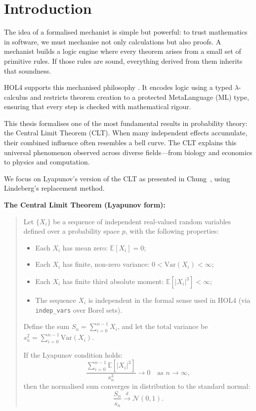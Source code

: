 \chapter[Introduction]{Introduction}
\label{chap:1}

The idea of a formalised mechanist is simple but powerful: to trust mathematics in software, we must mechanise not only calculations but also proofs. A mechanist builds a logic engine where every theorem arises from a small set of primitive rules. If those rules are sound, everything derived from them inherits that soundness.

HOL4 supports this mechanised philosophy \cite{slind2008brief}. It encodes logic using a typed \(\lambda\)-calculus and restricts theorem creation to a protected MetaLanguage (ML) type, ensuring that every step is checked with mathematical rigour.

This thesis formalises one of the most fundamental results in probability theory: the Central Limit Theorem (CLT). When many independent effects accumulate, their combined influence often resembles a bell curve. The CLT explains this universal phenomenon observed across diverse fields—from biology and economics to physics and computation.

We focus on Lyapunov’s version of the CLT as presented in Chung~\cite{Chung:2001}, using Lindeberg’s replacement method.


\medskip
\noindent
\textbf{The Central Limit Theorem (Lyapunov form):}
\begin{quote}
Let \( \{X_i\} \) be a sequence of independent real-valued random variables defined over a probability space \( p \), with the following properties:
\begin{itemize}
  \item Each \( X_i \) has mean zero: \( \mathbb{E}[X_i] = 0 \);
  \item Each \( X_i \) has finite, non-zero variance: \( 0 < \text{Var}(X_i) < \infty \);
  \item Each \( X_i \) has finite third absolute moment: \( \mathbb{E}[|X_i|^3] < \infty \);
  \item The sequence \( X_i \) is independent in the formal sense used in HOL4 (via \texttt{indep\_vars} over Borel sets).
\end{itemize}

Define the sum \( S_n = \sum_{i=0}^{n-1} X_i \), and let the total variance be \( s_n^2 = \sum_{i=0}^{n-1} \text{Var}(X_i) \).

If the Lyapunov condition holds:
\[
\frac{\sum_{i=0}^{n-1} \mathbb{E}[|X_i|^3]}{s_n^3} \to 0 \quad \text{as } n \to \infty,
\]
then the normalised sum converges in distribution to the standard normal:
\[
\frac{S_n}{s_n} \xrightarrow{d} \mathcal{N}(0,1).
\]
\end{quote}

